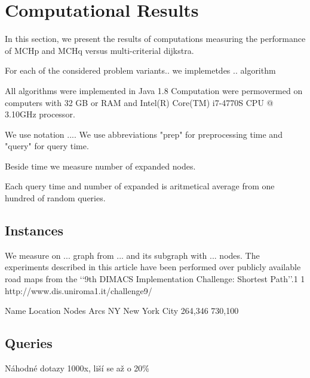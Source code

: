 
\section{Computational Results}
In this section, we present the results of computations measuring the performance
of MCHp and MCHq versus multi-criterial dijkstra.

For each of the considered problem variants..
we implemetdes .. algorithm

All algorithms were implemented in Java 1.8 
Computation were permovermed on computers with 32 GB or RAM
and  Intel(R) Core(TM) i7-4770S CPU @ 3.10GHz processor.

We use notation .... We use abbreviations "prep" for preprocessing time
and "query" for query time.

Beside time we measure number of expanded nodes.

Each query time and number of expanded is aritmetical average
from one hundred of random queries.
\subsection{Instances}

We measure on ... graph from ... and its subgraph with ... nodes.
The experiments described in this article have been performed
over publicly available road maps from the ‘‘9th DIMACS Implementation
Challenge: Shortest Path’’.1
1 http://www.dis.uniroma1.it/challenge9/

Name	Location	Nodes	Arcs
NY	New York City	264,346	730,100

\subsection{Queries}

Náhodné dotazy 1000x, liší se až o 20\%


